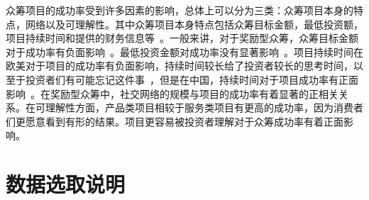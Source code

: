 \documentclass[lang=cn,a4paper]{elegantpaper}
\begin{document}
众筹项目的成功率受到许多因素的影响，总体上可以分为三类：众筹项目本身的特点，网络以及可理解性。其中众筹项目本身特点包括众筹目标金额，最低投资额，项目持续时间和提供的财务信息等~\citep{LUKKARINEN201626}。一般来讲，对于奖励型众筹，众筹目标金额对于成功率有负面影响~\citep{ZHENG2014488,https://doi.org/10.1111/fima.12262}。最低投资金额对成功率没有显著影响~\citep{agrawal2014some}。项目持续时间在欧美对于项目的成功率有负面影响，持续时间较长给了投资者较长的思考时间，以至于投资者们有可能忘记这件事~\citep{MOLLICK20141,H2014Crowdfunding}，但是在中国，持续时间对于项目成功率有正面影响~\citep{ZHENG2014488}。在奖励型众筹中，社交网络的规模与项目的成功率有着显著的正相关关系\citep{etter2013launch}。在可理解性方面，产品类项目相较于服务类项目有更高的成功率，因为消费者们更愿意看到有形的结果\citep{belleflamme2013individual}。项目更容易被投资者理解对于众筹成功率有着正面影响\citep{H2014Crowdfunding}。




\section{数据选取说明}
\end{document}
